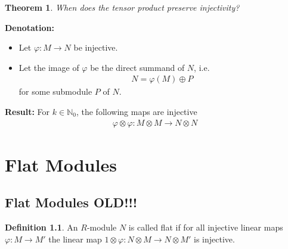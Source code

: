 \documentclass[a4paper]{book}
\theoremstyle{definition}
\newtheorem{definition}{Definition}[]
\newtheorem{theorem}[definition]{Theorem}
\begin{document}
\begin{theorem}
    \textit{When does the tensor product preserve injectivity?}

    \noindent\textbf{Denotation: }\begin{itemize}
        \item Let \(\varphi: M \rightarrow N\) be injective.
        \item Let the image of \(\varphi\) be the direct summand of \(N\), i.e. \begin{align*}
            N = \varphi(M) \oplus P
        \end{align*}
        for some submodule \(P\) of \(N\).
    \end{itemize}

    \noindent\textbf{Result: } For \(k \in \mathbb{N}_0\), the following maps are injective
    \begin{align*}
        \varphi \otimes \varphi: M \otimes M \rightarrow N \otimes N
    \end{align*}
\end{theorem}


\chapter{Flat Modules}
\section{Flat Modules OLD!!!}

\begin{defbox}
    \begin{definition}
        An {\color{mathobj}\(R\)-module} \(N\) is called {\color{maththen}flat} if for all injective linear maps \(\varphi: M \rightarrow M'\) the linear map \(1 \otimes \varphi: N \otimes M \rightarrow N \otimes M'\) is injective.
    \end{definition}
\end{defbox}
\end{document}
